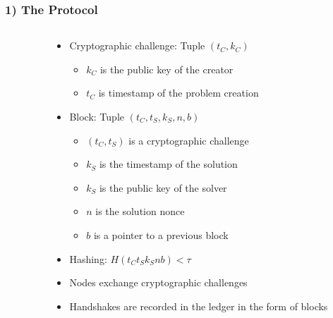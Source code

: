 \documentclass{beamer}
\begin{document}
\begin{frame}
	\frametitle{1) The Protocol}
	\begin{columns}
		\begin{column}{0.3\textwidth}
			\hfil
		\end{column}

		\begin{column}{0.7\textwidth}
			\begin{itemize}
				\item Cryptographic challenge: Tuple $(t_C, k_C)$
					\begin{itemize}
						\item $k_C$ is the public key of the creator
						\item $t_C$ is timestamp of the problem creation
					\end{itemize}
				\item Block: Tuple $(t_C, t_S, k_S, n, b)$
					\begin{itemize}
						\item $(t_C, t_S)$ is a cryptographic challenge
						\item $k_S$ is the timestamp of the solution
						\item $k_S$ is the public key of the solver
						\item $n$ is the solution nonce
						\item $b$ is a pointer to a previous block
					\end{itemize}
				\item Hashing: $H(t_C t_S k_S n b) < \tau$
				\item Nodes exchange cryptographic challenges
				\item Handshakes are recorded in the ledger
					in the form of blocks
			\end{itemize}
		\end{column}
	\end{columns}

\end{frame}
\end{document}
